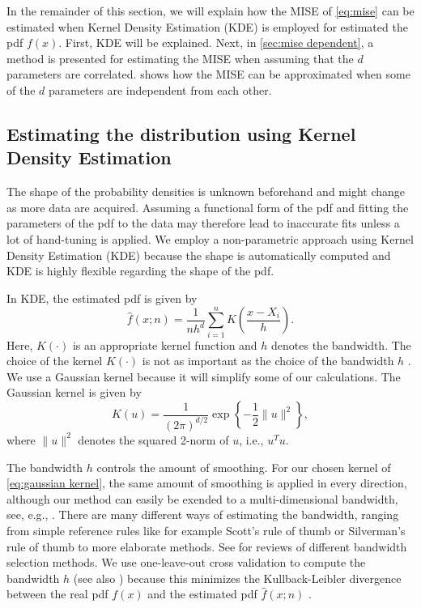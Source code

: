 In the remainder of this section, we will explain how the MISE of \cref{eq:mise} can be estimated when Kernel Density Estimation (KDE) is employed for estimated the pdf $f(x)$. First, KDE will be explained. Next, in \cref{sec:mise dependent}, a method is presented for estimating the MISE when assuming that the $d$ parameters are correlated.  shows how the MISE can be approximated when some of the $d$ parameters are independent from each other.

\subsection{Estimating the distribution using Kernel Density Estimation}
\label{sec:kde}

The shape of the probability densities is unknown beforehand and might change as more data are acquired. Assuming a functional form of the pdf and fitting the parameters of the pdf to the data may therefore lead to inaccurate fits unless a lot of hand-tuning is applied. We employ a non-parametric approach using Kernel Density Estimation (KDE) \cite{rosenblatt1956remarks, parzen1962estimation} because the shape is automatically computed and KDE is highly flexible regarding the shape of the pdf.

In KDE, the estimated pdf is given by
\begin{equation}
	\label{eq:kde}
	\hat{f}(x;n) = \frac{1}{nh^d} \sum_{i=1}^n K\left(\frac{x - X_i}{h}\right).
\end{equation}
Here, $K(\cdot)$ is an appropriate kernel function and $h$ denotes the bandwidth. The choice of the kernel $K(\cdot)$ is not as important as the choice of the bandwidth $h$ \cite{turlach1993bandwidthselection}. We use a Gaussian kernel because it will simplify some of our calculations. The Gaussian kernel is given by
\begin{equation}
	\label{eq:gaussian kernel}
	K(u) = \frac{1}{\left( 2\pi \right)^{d/2}} \exp \left\{ -\frac{1}{2} \|u\|^2 \right\},
\end{equation}
where $\|u\|^2$ denotes the squared 2-norm of $u$, i.e., $u^T u$.

The bandwidth $h$ controls the amount of smoothing. For our chosen kernel of \cref{eq:gaussian kernel}, the same amount of smoothing is applied in every direction, although our method can easily be exended to a multi-dimensional bandwidth, see, e.g., \textcite{chen2017tutorial}. There are many different ways of estimating the bandwidth, ranging from simple reference rules like for example Scott's rule of thumb \cite{scott2015multivariate} or Silverman's rule of thumb \cite{silverman1986density} to more elaborate methods. See \textcite{turlach1993bandwidthselection, bashtannyk2001bandwidth, jones1996brief, chiu1996comparative} for reviews of different bandwidth selection methods. We use one-leave-out cross validation to compute the bandwidth $h$ (see also \textcite{duin1976parzen}) because this minimizes the Kullback-Leibler divergence between the real pdf $f(x)$ and the estimated pdf $\hat{f}(x;n)$ \cite{turlach1993bandwidthselection,zambom2013review}.


